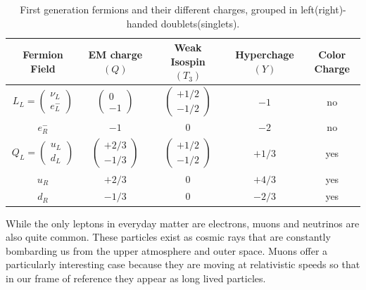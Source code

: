 \begin{table}
\begin{center}
\small
\begin{tabular}{c|c|c|c||c}
\hline 
\hline
Fermion Field & EM charge $\left(Q\right)$ & Weak Isospin $\left(T_{3}\right)$ & Hyperchage $\left(Y\right)$ & Color Charge \\ \hline
$L_{L} = \begin{pmatrix} \nu_{L} \\ e^{-}_{L} \end{pmatrix}$ & $\begin{pmatrix} 0 \\ -1 \end{pmatrix}$ & $\begin{pmatrix} +1/2 \\ -1/2 \end{pmatrix}$ & $-1$ & no \\
$e_{R}^{-}$ & $-1$ & $0$ & $-2$ & no \\
\hline
$Q_{L} = \begin{pmatrix} u_{L} \\ d_{L} \end{pmatrix}$ & $\begin{pmatrix} +2/3 \\ -1/3 \end{pmatrix}$ & $\begin{pmatrix} +1/2 \\ -1/2 \end{pmatrix}$ & $+1/3$ & yes \\
$u_{R}$ & $+2/3$ & $0$ & $+4/3$ & yes \\
$d_{R}$ & $-1/3$ & $0$ & $-2/3$ & yes \\
\hline
\hline
\end{tabular}
\end{center}
\caption[First generation fermions and their different charges, grouped in left(right)-handed doublets(singlets).]{First generation fermions and their different charges, grouped in left(right)-handed doublets(singlets).}
\label{tab:FermionFields}
\end{table}


While the only leptons in everyday matter are electrons, muons and neutrinos are also quite common. These particles exist as cosmic rays that are constantly bombarding us from the upper atmosphere and outer space. Muons offer a particularly interesting case because they are moving at relativistic speeds so that in our frame of reference they appear as long lived particles.

